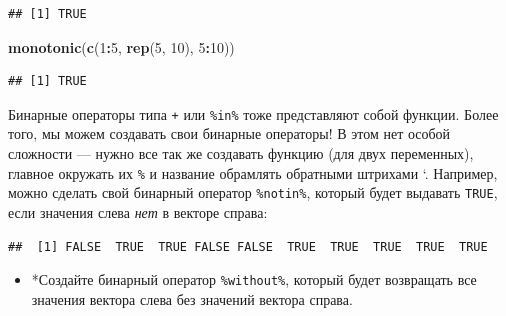\documentclass[]{book}
\newenvironment{Shaded}{\begin{snugshade}}{\end{snugshade}}
\newcommand{\KeywordTok}[1]{\textcolor[rgb]{0.13,0.29,0.53}{\textbf{#1}}}
\newcommand{\DataTypeTok}[1]{\textcolor[rgb]{0.13,0.29,0.53}{#1}}
\newcommand{\DecValTok}[1]{\textcolor[rgb]{0.00,0.00,0.81}{#1}}
\newcommand{\StringTok}[1]{\textcolor[rgb]{0.31,0.60,0.02}{#1}}
\newcommand{\ControlFlowTok}[1]{\textcolor[rgb]{0.13,0.29,0.53}{\textbf{#1}}}
\newcommand{\OperatorTok}[1]{\textcolor[rgb]{0.81,0.36,0.00}{\textbf{#1}}}
\newcommand{\NormalTok}[1]{#1}
\providecommand{\tightlist}{%
  \setlength{\itemsep}{0pt}\setlength{\parskip}{0pt}}
\begin{document}
\begin{verbatim}
## [1] TRUE
\end{verbatim}

\begin{Shaded}
\begin{Highlighting}[]
\KeywordTok{monotonic}\NormalTok{(}\KeywordTok{c}\NormalTok{(}\DecValTok{1}\OperatorTok{:}\DecValTok{5}\NormalTok{, }\KeywordTok{rep}\NormalTok{(}\DecValTok{5}\NormalTok{, }\DecValTok{10}\NormalTok{), }\DecValTok{5}\OperatorTok{:}\DecValTok{10}\NormalTok{))}
\end{Highlighting}
\end{Shaded}

\begin{verbatim}
## [1] TRUE
\end{verbatim}

Бинарные операторы типа \texttt{+} или \texttt{\%in\%} тоже представляют
собой функции. Более того, мы можем создавать свои бинарные операторы! В
этом нет особой сложности --- нужно все так же создавать функцию (для
двух переменных), главное окружать их \texttt{\%} и название обрамлять
обратными штрихами `. Например, можно сделать свой бинарный оператор
\texttt{\%notin\%}, который будет выдавать \texttt{TRUE}, если значения
слева \emph{нет} в векторе справа:

\begin{Shaded}
\end{Shaded}

\begin{verbatim}
##  [1] FALSE  TRUE  TRUE FALSE FALSE  TRUE  TRUE  TRUE  TRUE  TRUE
\end{verbatim}

\begin{itemize}
\tightlist
\item
  *Создайте бинарный оператор \texttt{\%without\%}, который будет
  возвращать все значения вектора слева без значений вектора справа.
\end{itemize}

\begin{Shaded}
\end{Shaded}
\end{document}
